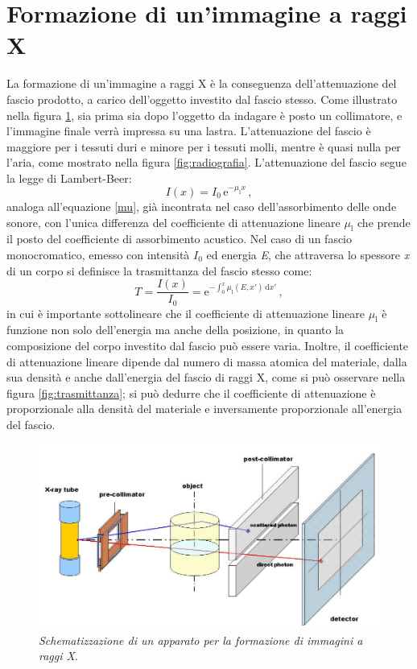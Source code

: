 \documentclass{report}
\newcommand{\figref}[1]{figura \ref{#1}}
\renewcommand{\eqref}[1]{equazione \ref{#1}}
\numberwithin{equation}{section}
\numberwithin{figure}{section}
\begin{document}
\section{Formazione di un'immagine a raggi X}\label{4.2}
La formazione di un'immagine a raggi X è la conseguenza dell'attenuazione del fascio prodotto, a carico dell'oggetto investito dal fascio stesso. Come illustrato nella \figref{fig:apparatox}, sia prima sia dopo l'oggetto da indagare è posto un collimatore, e l'immagine finale verrà impressa su una lastra. L'attenuazione del fascio è maggiore per i tessuti duri e minore per i tessuti molli, mentre è quasi nulla per l'aria, come mostrato nella \figref{fig:radiografia}. L'attenuazione del fascio segue la legge di Lambert-Beer:
\begin{equation}\label{lambert}
    I(x) = I_0\,\mathrm{e}^{-\mu_\mathrm{l}x}\,,
\end{equation}
analoga all'\eqref{mu}, già incontrata nel caso dell'assorbimento delle onde sonore, con l'unica differenza del coefficiente di attenuazione lineare $\mu_\mathrm{l}$ che prende il posto del coefficiente di assorbimento acustico. Nel caso di un fascio monocromatico, emesso con intensità $I_0$ ed energia \textit{E}, che attraversa lo spessore \textit{x} di un corpo si definisce la trasmittanza del fascio stesso come:
\begin{equation}
    T = \frac{I(x)}{I_0} = \mathrm{e}^{-\int_0^x \mu_\mathrm{l}(E,x')\,\mathrm{d}x'}\,,
\end{equation}
in cui è importante sottolineare che il coefficiente di attenuazione lineare $\mu_\mathrm{l}$ è funzione non solo dell'energia ma anche della posizione, in quanto la composizione del corpo investito dal fascio può essere varia. Inoltre, il coefficiente di attenuazione lineare dipende dal numero di massa atomica del materiale, dalla sua densità e anche dall'energia del fascio di raggi X, come si può osservare nella \figref{fig:trasmittanza}; si può dedurre che il coefficiente di attenuazione è proporzionale alla densità del materiale e inversamente proporzionale all'energia del fascio.

\begin{figure}[htp]
\centering
\includegraphics[scale=0.6]{immagini/apparatox.png}
\caption{\label{fig:apparatox} \textit{Schematizzazione di un apparato per la formazione di immagini a raggi X}.}
\end{figure}
\end{document}
